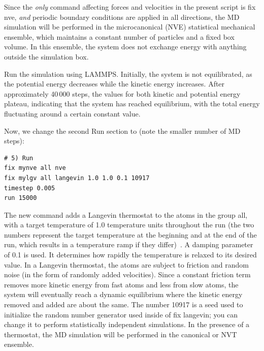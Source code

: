 \documentclass[9pt,tutorial]{livecoms}
\newcommand{\lmpcmd}[1]{\colorbox{listing}{\textcolor{command}{\small{#1}}}} %
\begin{document}
\begin{note}
  Since the \emph{only} command affecting forces
  and velocities in the present script is \lmpcmd{fix nve}, \emph{and}
  periodic boundary conditions are applied in all directions, the MD
  simulation will be performed in the microcanonical (NVE) 
  statistical mechanical ensemble, which maintains a constant number
  of particles and a fixed box volume. In this ensemble, the system does
  not exchange energy with anything outside the simulation box.
\end{note}

Run the simulation using LAMMPS.  Initially, the system is
not equilibrated, as the potential energy
decreases while the kinetic energy increases.  After approximately
40\,000 steps, the values for both kinetic and potential energy
plateau, indicating that the system has reached equilibrium, with
the total energy fluctuating around a certain constant value.

Now, we change the second \lmpcmd{Run} section to 
(note the smaller number of MD steps):
\begin{lstlisting}
# 5) Run
fix mynve all nve
fix mylgv all langevin 1.0 1.0 0.1 10917
timestep 0.005
run 15000
\end{lstlisting}
The new command adds a Langevin thermostat to the atoms in the group
\lmpcmd{all}, with a target temperature of 1.0 temperature units
throughout the run (the two numbers represent the target temperature at
the beginning and at the end of the run, which results in a temperature
ramp if they differ)~\cite{schneider1978molecular}.  A \lmpcmd{damping}
parameter of 0.1 is used.  It determines how rapidly the temperature is
relaxed to its desired value.  In a Langevin thermostat, the atoms are
subject to friction and random noise (in the form of randomly added
velocities).  Since a constant friction term removes more kinetic energy
from fast atoms and less from slow atoms, the system will eventually
reach a dynamic equilibrium where the kinetic energy removed and added
are about the same.  The number 10917 is a seed used to initialize the
random number generator used inside of \lmpcmd{fix langevin}; you can
change it to perform statistically independent simulations.  In the
presence of a thermostat, the MD simulation will be performed in the
canonical or NVT ensemble.
\end{document}
